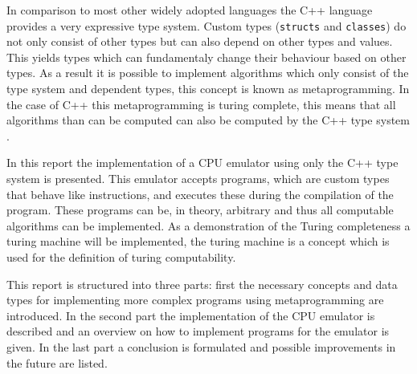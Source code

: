 

In comparison to most other widely adopted languages the C++ language provides a very expressive type system. Custom
types (\lstinline{structs} and \lstinline{classes}) do not only consist of other types but can also depend on other
types and values. This yields types which can fundamentaly change their behaviour based on other types. As a result
it is possible to implement algorithms which only consist of the type system and dependent types, this concept is known
as metaprogramming. In the case of C++ this metaprogramming is turing complete, this means that all algorithms than
can be computed can also be computed by the C++ type system .

In this report the implementation of a CPU emulator using only the C++ type system is presented. This emulator
accepts programs, which are custom types that behave like instructions, and executes these during the compilation of
the program. These programs can be, in theory, arbitrary and thus all computable algorithms can be implemented. As a
demonstration of the Turing completeness a turing machine will be implemented, the turing machine is a concept which
is used for the definition of turing computability.

This report is structured into three parts: first the necessary concepts and data types for implementing more complex 
programs using metaprogramming are introduced. In the second part the implementation of the CPU emulator is described
and an overview on how to implement programs for the emulator is given. In the last part a conclusion is formulated and
possible improvements in the future are listed.
